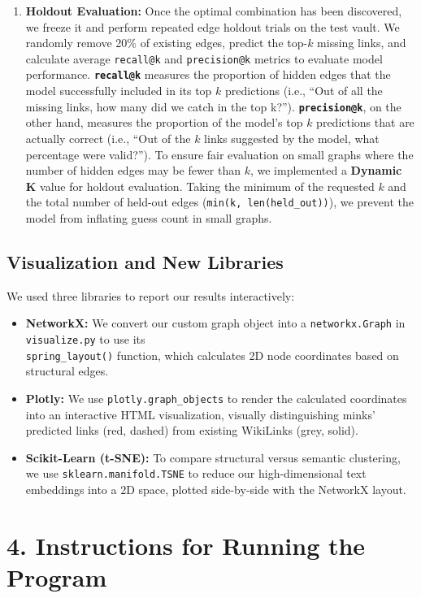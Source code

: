 \documentclass[fontsize=11pt]{article}
\begin{document}
\begin{enumerate}
     \item \textbf{Holdout Evaluation:} Once the optimal combination has been discovered, we freeze it and perform repeated edge holdout trials on the test vault. We randomly remove 20\% of existing edges, predict the top-$k$ missing links, and calculate average \texttt{recall@k} and \texttt{precision@k} metrics to evaluate model performance. \textbf{\texttt{recall@k}} measures the proportion of hidden edges that the model successfully included in its top $k$ predictions (i.e., \enquote{Out of all the missing links, how many did we catch in the top k?}). \textbf{\texttt{precision@k}}, on the other hand, measures the proportion of the model's top $k$ predictions that are actually correct (i.e., \enquote{Out of the $k$ links suggested by the model, what percentage were valid?}). To ensure fair evaluation on small graphs where the number of hidden edges may be fewer than $k$, we implemented a \textbf{Dynamic K} value for holdout evaluation. Taking the minimum of the requested $k$ and the total number of held-out edges (\texttt{min(k, len(held\_out))}), we prevent the model from inflating guess count in small graphs.
\end{enumerate}

\subsection*{Visualization and New Libraries}
We used three libraries to report our results interactively:
\begin{itemize}
    \item \textbf{NetworkX:} We convert our custom graph object into a \texttt{networkx.Graph} in \texttt{visualize.py} to use its\\ \texttt{spring\_layout()} function, which calculates 2D node coordinates based on structural edges.
    \item \textbf{Plotly:} We use \texttt{plotly.graph\_objects} to render the calculated coordinates into an interactive HTML visualization, visually distinguishing minks' predicted links (red, dashed) from existing WikiLinks (grey, solid).
    \item \textbf{Scikit-Learn (t-SNE):} To compare structural versus semantic clustering, we use \texttt{sklearn.manifold.TSNE} to reduce our high-dimensional text embeddings into a 2D space, plotted side-by-side with the NetworkX layout.
\end{itemize}

\section*{4. Instructions for Running the Program}
\end{document}
